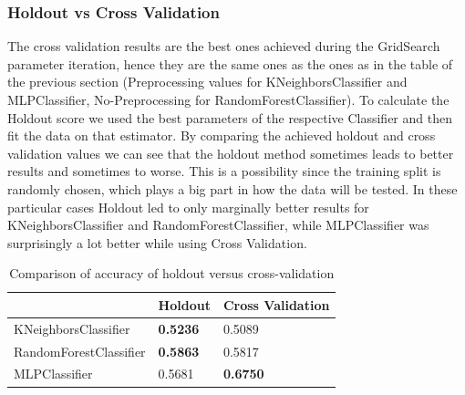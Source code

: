 \subsubsection{Holdout vs Cross Validation}
The cross validation results are the best ones achieved during the GridSearch parameter iteration, hence they are the same ones as the ones as in the table of the previous section (Preprocessing values for KNeighborsClassifier and MLPClassifier, No-Preprocessing for RandomForestClassifier). To calculate the Holdout score we used the best parameters of the respective Classifier and then fit the data on that estimator. 
By comparing the achieved holdout and cross validation values we can see that the holdout method sometimes leads to better results and sometimes to worse. This is a possibility since the training split is randomly chosen, which plays a big part in how the data will be tested. In these particular cases Holdout led to only marginally better results for KNeighborsClassifier and RandomForestClassifier, while MLPClassifier was surprisingly a lot better while using Cross Validation. 

\begin{table}[h]
\begin{center}
\begin{tabular}{|l|l|l|}
\hline
                       & Holdout & Cross Validation \\ \hline
KNeighborsClassifier   & \textbf{0.5236}  & 0.5089           \\ \hline
RandomForestClassifier & \textbf{0.5863}  & 0.5817           \\ \hline
MLPClassifier          & 0.5681  & \textbf{0.6750}           \\ \hline
\end{tabular}
\caption{Comparison of accuracy of holdout versus cross-validation}
\end{center}
\end{table}

%
